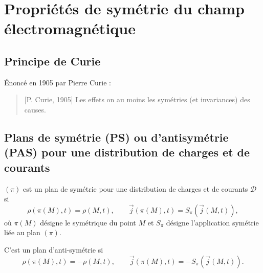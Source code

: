 \section[Propriétés de symétrie]{Propriétés de symétrie du champ électromagnétique}

    \subsection{Principe de Curie}

        Énoncé en 1905 par Pierre Curie :
        \begin{quote}[P. Curie, 1905]
            Les effets on au moins les symétries (et invariances) des causes.
        \end{quote}

    \subsection{Plans de symétrie (PS) ou d'antisymétrie (PAS) pour une distribution de charges et de courants}

        $(\pi)$ est un plan de symétrie pour une distribution de charges et de courants $\mathcal{D}$ si 
        \begin{equation*}
            \rho(\pi(M),t)=\rho(M,t),\qquad \vec{j}(\pi(M),t)=S_{\pi}(\vec{j}(M,t)),
        \end{equation*}
        où $\pi(M)$ désigne le symétrique du point $M$ et $S_{\pi}$ désigne l'application symétrie liée au plan $(\pi)$.

        C'est un plan d'anti-symétrie si
        \begin{equation*}
            \rho(\pi(M),t)=-\rho(M,t),\qquad \vec{j}(\pi(M),t)=-S_{\pi}(\vec{j}(M,t)).
        \end{equation*}

